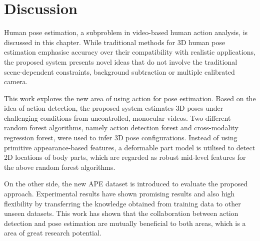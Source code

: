 

\section{Discussion}
\label{sec/body/conclusions}

Human pose estimation, a subproblem in video-based human action analysis, is discussed in this chapter.  
While traditional methods for 3D human pose estimation emphasise accuracy over their compatibility with realistic applications, the proposed system presents novel ideas that do not involve the traditional scene-dependent constraints, \eg background subtraction or multiple calibrated camera.

This work explores the new area of using action for pose estimation. 
Based on the idea of action detection, the proposed system estimates 3D poses under challenging conditions from uncontrolled, monocular videos.
Two different random forest algorithms, namely action detection forest and cross-modality regression forest, were used to infer 3D pose configurations. Instead of using primitive appearance-based features, a deformable part model is utilised to detect 2D locations of body parts, which are regarded as robust mid-level features for the above random forest algorithms.

On the other side, the new APE dataset is introduced to evaluate the proposed approach.  
Experimental results have shown promising results and also high flexibility by transferring the knowledge obtained from training data to other unseen datasets. This work has shown that the collaboration between action detection and pose estimation are mutually beneficial to both areas, which is a area of great research potential.   
